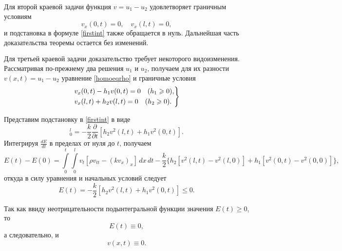 Для второй краевой задачи функция $v = u_1 - u_2$ удовлетворяет граничным условиям 
\begin{equation}
	v_x(0, t) = 0, \quad v_x(l, t) = 0,
\end{equation}
и подстановка в формуле \eqref{firstint} также обращается в нуль. Дальнейшая часть доказательства теоремы остается без изменений.

Для третьей краевой задачи доказательство требует некоторого видоизменения. Рассматривая по-прежнему два решения $u_1$ и $u_2$, получаем для их разности $v(x, t) = u_1 - u_2$ уравнение \eqref{homoeqrho} и граничные условия 
\begin{equation}
	\begin{rcases}
		v_x(0, t) - h_1 v(0, t) = 0 \quad (h_1 \geqslant 0), \\
		v_x(l, t) + h_2 v(l, t) = 0 \quad (h_2 \geqslant 0).
	\end{rcases}
\end{equation}

Представим подстановку в \eqref{firstint} в виде 
\begin{equation}
	[k v_x v_t]_{0}^{l} = - \frac{k}{2} \frac{\partial}{\partial t}[h_2 v^2(l, t) + h_1 v^2(0, t)].
\end{equation}
Интегрируя $\frac{dE}{dt}$ в пределах от нуля до $t$, получаем
\begin{equation}
	E(t) - E(0) = \int \limits_{0}^{t} \int \limits_{0}^{l} v_t[\rho v_{tt} - (k v_x)_x] \, dx \, dt - \frac{k}{2} \{h_2[v^2(l, t) - v^2(l, 0)] + h_1[v^2(0, t) - v^2(0, 0)]\},
\end{equation}
откуда в силу уравнения и начальных условий следует 
\begin{equation}
	E(t) = -\frac{k}{2} [h_2 v^2(l, t) + h_1 v^2(0, t)] \leqslant 0.
\end{equation}

Так как ввиду неотрицательности подынтегральной функции значения $E(t) \geqslant 0$, то 
\begin{equation}
	E(t) \equiv 0,
\end{equation}
а следовательно, и
\begin{equation}
	v(x, t) \equiv 0.
\end{equation}


